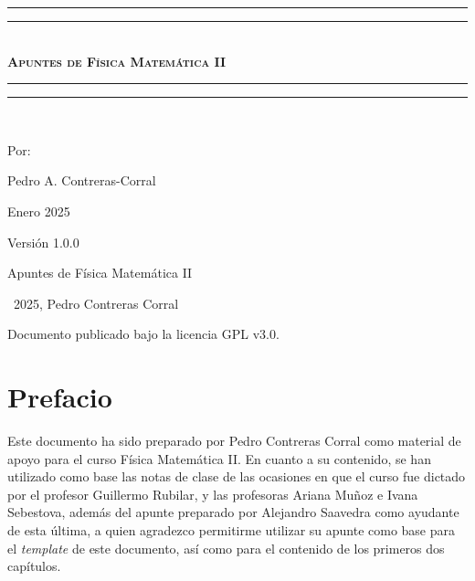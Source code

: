 \documentclass[letterpaper,12pt, twoside]{book}
\newlength{\drop}
\theoremstyle{definition}
\begin{document}
\newpage

\thispagestyle{empty}


\newpage

\begin{titlepage}
 \textheight
    \centering
    \vspace*{\baselineskip}
    \rule{\textwidth}{1.6pt}\vspace*{-\baselineskip}\vspace*{2pt}
    \rule{\textwidth}{0.4pt}\\[\baselineskip]
    {\scshape\bfseries\Huge{}\selectfont Apuntes de Física Matemática II} \\[0.2\baselineskip]
    \rule{\textwidth}{0.4pt}\vspace*{-\baselineskip}\vspace{3.2pt}
    \rule{\textwidth}{1.6pt}\\[\baselineskip]
    {\Large Por: \par}
{\large Pedro A. Contreras-Corral \par}
{\large Enero 2025 \par}
\vfill
{\large Versión 1.0.0 \par}
\end{titlepage}

\mbox{} 
\vfill
Apuntes de Física Matemática II 

\textcopyright\ 2025, Pedro Contreras Corral %



Documento publicado bajo la licencia GPL v3.0.


\vspace{1cm} 

\restoregeometry

\chapter*{Prefacio}

Este documento ha sido preparado por Pedro Contreras Corral como material de apoyo para el curso Física Matemática II. En cuanto a su contenido, se han utilizado como base las notas de clase de las ocasiones en que el curso fue dictado por el profesor Guillermo Rubilar, y las profesoras Ariana Muñoz e Ivana Sebestova, además del apunte preparado por Alejandro Saavedra como ayudante de esta última, a quien agradezco permitirme utilizar su apunte como base para el \emph{template} de este documento, así como para el contenido de los primeros dos capítulos.
\end{document}
